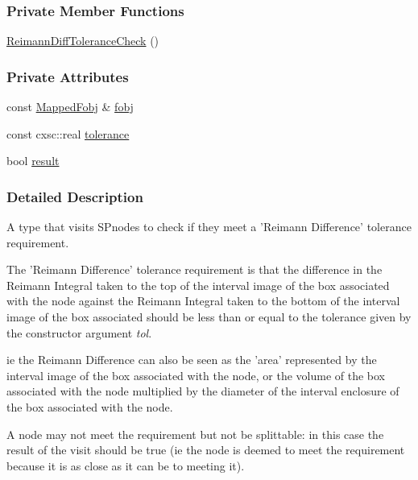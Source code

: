 \subsubsection*{\-Private \-Member \-Functions}
\begin{DoxyCompactItemize}
\item 
\hyperlink{classsubpavings_1_1ReimannDiffToleranceCheck_aefe8d51eaccb256b3631296a6413a799}{\-Reimann\-Diff\-Tolerance\-Check} ()
\end{DoxyCompactItemize}
\subsubsection*{\-Private \-Attributes}
\begin{DoxyCompactItemize}
\item 
const \hyperlink{classsubpavings_1_1MappedFobj}{\-Mapped\-Fobj} \& \hyperlink{classsubpavings_1_1ReimannDiffToleranceCheck_ad9e4145536f0654d9982cc86931c1f27}{fobj}
\item 
const cxsc\-::real \hyperlink{classsubpavings_1_1ReimannDiffToleranceCheck_a169f5efe98a632fc95bc8bd39f963193}{tolerance}
\item 
bool \hyperlink{classsubpavings_1_1ReimannDiffToleranceCheck_ad750609be6399d2f013430a6651420ca}{result}
\end{DoxyCompactItemize}


\subsubsection{\-Detailed \-Description}
\-A type that visits  \-S\-Pnodes to check if they meet a '\-Reimann \-Difference' tolerance requirement. 

\-The '\-Reimann \-Difference' tolerance requirement is that the difference in the \-Reimann \-Integral taken to the top of the interval image of the box associated with the node against the \-Reimann \-Integral taken to the bottom of the interval image of the box associated should be less than or equal to the tolerance given by the constructor argument {\itshape tol\/}.

ie the \-Reimann \-Difference can also be seen as the 'area' represented by the interval image of the box associated with the node, or the volume of the box associated with the node multiplied by the diameter of the interval enclosure of the box associated with the node.

\-A node may not meet the requirement but not be splittable\-: in this case the result of the visit should be true (ie the node is deemed to meet the requirement because it is as close as it can be to meeting it).

